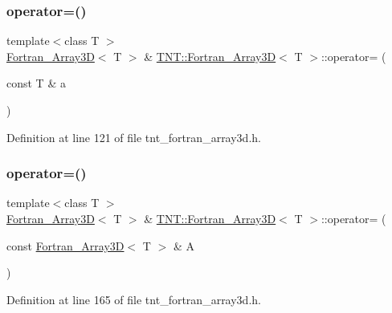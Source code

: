 \subsubsection{\texorpdfstring{operator=()}{operator=()}\hspace{0.1cm}{\footnotesize\ttfamily [1/2]}}
{\footnotesize\ttfamily template$<$class T $>$ \\
\hyperlink{classTNT_1_1Fortran__Array3D}{Fortran\+\_\+\+Array3D}$<$ T $>$ \& \hyperlink{classTNT_1_1Fortran__Array3D}{T\+N\+T\+::\+Fortran\+\_\+\+Array3D}$<$ T $>$\+::operator= (\begin{DoxyParamCaption}\item[{const T \&}]{a }\end{DoxyParamCaption})\hspace{0.3cm}{\ttfamily [inline]}}



Definition at line 121 of file tnt\+\_\+fortran\+\_\+array3d.\+h.

\mbox{\label{classTNT_1_1Fortran__Array3D_a64f8785f3d81e07cb2df6e1bd7eefde5}} 
\subsubsection{\texorpdfstring{operator=()}{operator=()}\hspace{0.1cm}{\footnotesize\ttfamily [2/2]}}
{\footnotesize\ttfamily template$<$class T $>$ \\
\hyperlink{classTNT_1_1Fortran__Array3D}{Fortran\+\_\+\+Array3D}$<$ T $>$ \& \hyperlink{classTNT_1_1Fortran__Array3D}{T\+N\+T\+::\+Fortran\+\_\+\+Array3D}$<$ T $>$\+::operator= (\begin{DoxyParamCaption}\item[{const \hyperlink{classTNT_1_1Fortran__Array3D}{Fortran\+\_\+\+Array3D}$<$ T $>$ \&}]{A }\end{DoxyParamCaption})\hspace{0.3cm}{\ttfamily [inline]}}



Definition at line 165 of file tnt\+\_\+fortran\+\_\+array3d.\+h.

\mbox{\label{classTNT_1_1Fortran__Array3D_a344143d5f036e6bc72d111b83b577ed5}} 
